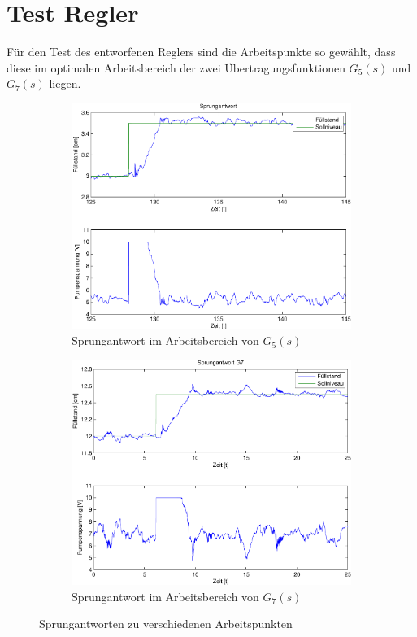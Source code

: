 \section{Test Regler}
Für den Test des entworfenen Reglers sind die Arbeitspunkte so gewählt, dass
diese im optimalen Arbeitsbereich der zwei Übertragungsfunktionen $G_5(s)$
und $G_7(s)$ liegen.
\begin{figure}[h!]
	\centering
	\begin{subfigure}{0.475\textwidth}
		\includegraphics[width=1\textwidth]{12/step_g5.pdf}
		\caption{Sprungantwort im Arbeitsbereich von $G_5(s)$}
	\end{subfigure}
	\hfill{}
	\begin{subfigure}{0.475\textwidth}
		\includegraphics[width=1\textwidth]{12/step_g7.pdf}
		\caption{Sprungantwort im Arbeitsbereich von $G_7(s)$}
	\end{subfigure}
	\caption{Sprungantworten zu verschiedenen Arbeitspunkten}
\end{figure}
